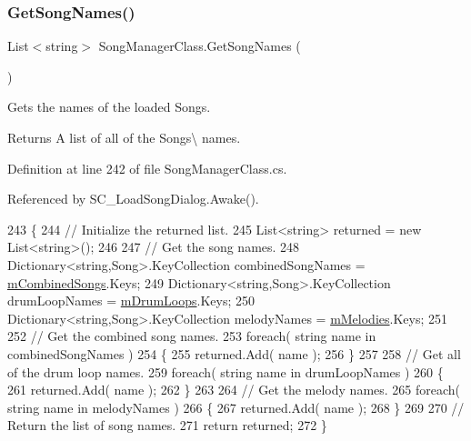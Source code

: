 \subsubsection{\texorpdfstring{Get\+Song\+Names()}{GetSongNames()}}
{\footnotesize\ttfamily List$<$string$>$ Song\+Manager\+Class.\+Get\+Song\+Names (\begin{DoxyParamCaption}{ }\end{DoxyParamCaption})}



Gets the names of the loaded Songs. 

\begin{DoxyReturn}{Returns}
A list of all of the Songs\textbackslash{}\textquotesingle{} names. 
\end{DoxyReturn}


Definition at line 242 of file Song\+Manager\+Class.\+cs.



Referenced by S\+C\+\_\+\+Load\+Song\+Dialog.\+Awake().


\begin{DoxyCode}
243     \{
244         \textcolor{comment}{// Initialize the returned list.}
245         List<string> returned = \textcolor{keyword}{new} List<string>();
246 
247         \textcolor{comment}{// Get the song names.}
248         Dictionary<string,Song>.KeyCollection combinedSongNames = \hyperlink{group___s_m_priv_var_gaf6b4ff41b8da95d10ad3db62df111faa}{mCombinedSongs}.Keys;
249         Dictionary<string,Song>.KeyCollection drumLoopNames = \hyperlink{group___s_m_priv_var_ga84f25335035755448d11acb9287360f2}{mDrumLoops}.Keys;
250         Dictionary<string,Song>.KeyCollection melodyNames = \hyperlink{group___s_m_priv_var_ga935e80f645d0546003f7df8443b79242}{mMelodies}.Keys;
251 
252         \textcolor{comment}{// Get the combined song names.}
253         \textcolor{keywordflow}{foreach}( \textcolor{keywordtype}{string} name \textcolor{keywordflow}{in} combinedSongNames )
254         \{
255             returned.Add( name );
256         \}
257 
258         \textcolor{comment}{// Get all of the drum loop names.}
259         \textcolor{keywordflow}{foreach}( \textcolor{keywordtype}{string} name \textcolor{keywordflow}{in} drumLoopNames )
260         \{
261             returned.Add( name );
262         \}
263 
264         \textcolor{comment}{// Get the melody names.}
265         \textcolor{keywordflow}{foreach}( \textcolor{keywordtype}{string} name \textcolor{keywordflow}{in} melodyNames )
266         \{
267             returned.Add( name );
268         \}
269 
270         \textcolor{comment}{// Return the list of song names.}
271         \textcolor{keywordflow}{return} returned;
272     \}
\end{DoxyCode}
\mbox{\label{group___s_m_pub_func_ga3bf6a6d42a7c5e94cc85ba10eb9e6edb}} 
